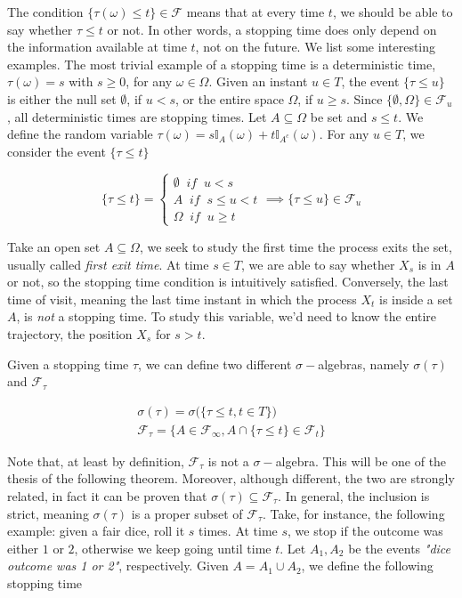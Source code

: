 The condition $\{ \tau(\omega) \leq t \} \in \mathcal{F}$ means that at every time $t$, we should be able to say whether $\tau \leq t$ or not. In other words, a stopping time does only depend on the information available at time $t$, not on the future. We list some interesting examples. The most trivial example of a stopping time is a deterministic time, $\tau(\omega) = s$ with $s \geq 0$, for any $\omega \in \Omega$. Given an instant $u \in T$, the event $\{ \tau \leq u \}$ is either the null set $\emptyset$, if $u < s$, or the entire space $\Omega$, if $u \geq s$. Since $\{ \emptyset, \Omega \} \in \mathcal{F}_u$, all deterministic times are stopping times. Let $A \subseteq \Omega$ be set and $s \leq t$. We define the random variable $\tau(\omega) = s \mathbb{I}_{A}(\omega) + t \mathbb{I}_{A^c}(\omega)$. For any $u \in T$, we consider the event $\{ \tau \leq t \}$

\begin{equation*}
    \{ \tau \leq t \} = 
    \begin{cases}
        \emptyset \;\; \textit{if} \;\; u < s \\
        A \;\; \textit{if} \;\; s \leq u < t \\
        \Omega \;\; \textit{if} \;\; u \geq t
    \end{cases}
    \implies \{\tau \leq u \} \in \mathcal{F}_u
\end{equation*}

Take an open set $A \subseteq \Omega$, we seek to study the first time the process exits the set, usually called \textit{first exit time}. At time $s \in T$, we are able to say whether $X_s$ is in $A$ or not, so the stopping time condition is intuitively satisfied. Conversely, the last time of visit, meaning the last time instant in which the process $X_t$ is inside a set $A$, is \textit{not} a stopping time. To study this variable, we'd need to know the entire trajectory, the position $X_s$ for $s > t$. 

Given a stopping time $\tau$, we can define two different $\sigma-$algebras, namely $\sigma(\tau)$ and $\mathcal{F}_{\tau}$ 

\begin{gather}
    \sigma(\tau) = \sigma\big(\{ \tau \leq t , t \in T \}\big) \\
    \mathcal{F}_{\tau} = \Big\{ A \in \mathcal{F}_{\infty}, A \cap \{ \tau \leq t \} \in \mathcal{F}_t  \Big\} 
\end{gather}

Note that, at least by definition, $\mathcal{F}_{\tau}$ is not a $\sigma-$algebra. This will be one of the thesis of the following theorem. Moreover, although different, the two are strongly related, in fact it can be proven that $\sigma(\tau) \subseteq \mathcal{F}_{\tau}$. In general, the inclusion is strict, meaning $\sigma(\tau)$ is a proper subset of $\mathcal{F}_{\tau}$. Take, for instance, the following example: given a fair dice, roll it $s$ times. At time $s$, we stop if the outcome was either $1$ or $2$, otherwise we keep going until time $t$. Let $A_1,A_2$ be the events \textit{"dice outcome was 1 or 2"}, respectively. Given $A = A_1 \cup A_2$, we define the following stopping time

